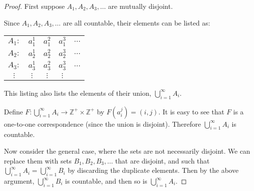 \documentclass[14pt]{extarticle}
\newcommand{\Z}{\mathbb{Z}}
\begin{document}
\begin{proof}
    First suppose \(A_1, A_2, A_3, \ldots\) are mutually disjoint.

    Since \(A_1, A_2, A_3, \ldots\) are all countable, their elements can be listed as:

    \begin{center}
        \begin{tabular}{ccccc}
            \(A_1:\)   & \(a_1^1\)  & \(a_1^2\)  & \(a_1^3\)  & \(\ldots\) \\
            \(A_2:\)   & \(a_2^1\)  & \(a_2^2\)  & \(a_2^3\)  & \(\ldots\) \\
            \(A_3:\)   & \(a_3^1\)  & \(a_3^2\)  & \(a_3^3\)  & \(\ldots\) \\
            \(\vdots\) & \(\vdots\) & \(\vdots\) & \(\vdots\) &            \\
        \end{tabular}
    \end{center}

    This listing also lists the elements of their union, \(\bigcup_{i=1}^{\infty} A_i\).

    Define \(F: \bigcup_{i=1}^{\infty} A_i \to \Z^+ \times \Z^+\) by \(F(a_i^j) = (i, j)\). It is easy to see that $F$ is
    a one-to-one correspondence (since the union is disjoint). Therefore \(\bigcup_{i=1}^{\infty} A_i\) is countable.

    Now consider the general case, where the sets are not necessarily disjoint. We can replace them with sets \(B_1,
    B_2, B_3, \ldots\) that are disjoint, and such that \(\bigcup_{i=1}^{\infty} A_i = \bigcup_{i=1}^{\infty} B_i\)
    by discarding the duplicate elements. Then by the above argument, \(\bigcup_{i=1}^{\infty} B_i\) is countable, and
    then so is \(\bigcup_{i=1}^{\infty} A_i\).
\end{proof}
\end{document}
